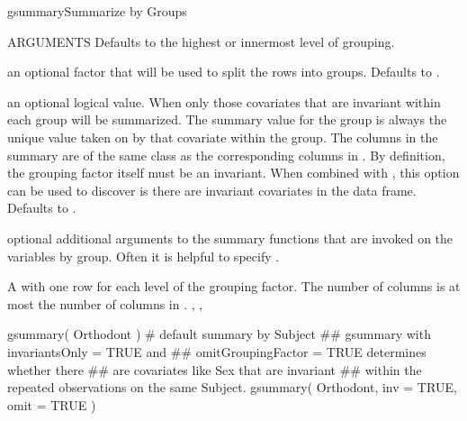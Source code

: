 \documentclass[pdftex]{article} \usepackage{url,graphicx}
\begin{document}
\begin{Helpfile}{gsummary}{Summarize by Groups}
\begin{Argument}{ARGUMENTS}
Defaults to the highest or innermost level of grouping.
\item[\Co{groups:}]
an optional factor that will be used to split the 
rows into groups.  Defaults to .
\item[\Co{invariantsOnly:}]
an optional logical value.  When  only 
those covariates that are invariant within each group will be
summarized.  The summary value for the group is always the unique
value taken on by that covariate within the group.  The columns in
the summary are of the same class as the corresponding columns in
. By definition, the grouping factor itself must be an
invariant.   When combined with ,
this option can be used to discover is there are invariant covariates 
in the data frame.  Defaults to .
\item[\Co{...:}]
optional additional arguments to the summary functions
that are invoked on the variables by group.  Often it is helpful to
specify .
\end{Argument}
A  with one row for each level of the grouping
factor.  The number of columns is at most the number of columns in
.
, ,
\need 15pt
\vspace{-16pt} 
\begin{Example}
gsummary( Orthodont )  # default summary by Subject
## gsummary with invariantsOnly = TRUE and 
## omitGroupingFactor = TRUE determines whether there 
## are covariates like Sex that are invariant
## within the repeated observations on the same Subject.
gsummary( Orthodont, inv = TRUE, omit = TRUE )
\end{Example}
\end{Helpfile}
\end{document}

